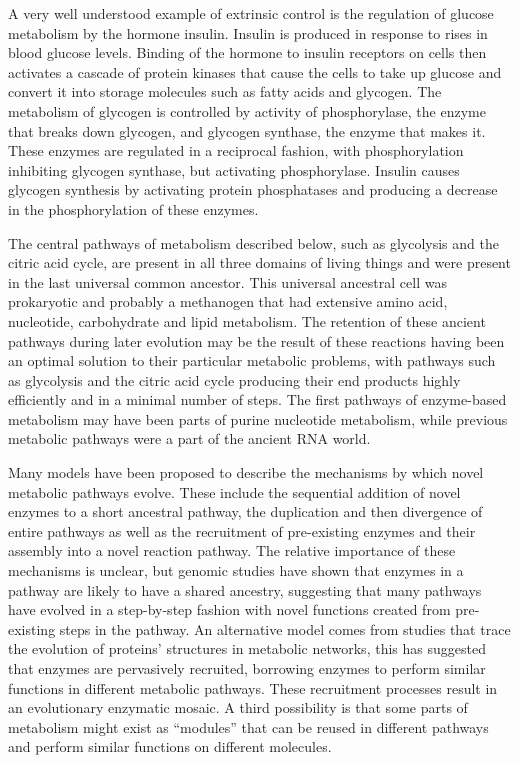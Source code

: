 A very well understood example of extrinsic control is the regulation of glucose metabolism by the hormone insulin. Insulin is produced in response to rises in blood glucose levels. Binding of the hormone to insulin receptors on cells then activates a cascade of protein kinases that cause the cells to take up glucose and convert it into storage molecules such as fatty acids and glycogen. The metabolism of glycogen is controlled by activity of phosphorylase, the enzyme that breaks down glycogen, and glycogen synthase, the enzyme that makes it. These enzymes are regulated in a reciprocal fashion, with phosphorylation inhibiting glycogen synthase, but activating phosphorylase. Insulin causes glycogen synthesis by activating protein phosphatases and producing a decrease in the phosphorylation of these enzymes.

The central pathways of metabolism described below, such as glycolysis and the citric acid cycle, are present in all three domains of living things and were present in the last universal common ancestor. This universal ancestral cell was prokaryotic and probably a methanogen that had extensive amino acid, nucleotide, carbohydrate and lipid metabolism. The retention of these ancient pathways during later evolution may be the result of these reactions having been an optimal solution to their particular metabolic problems, with pathways such as glycolysis and the citric acid cycle producing their end products highly efficiently and in a minimal number of steps. The first pathways of enzyme-based metabolism may have been parts of purine nucleotide metabolism, while previous metabolic pathways were a part of the ancient RNA world.

Many models have been proposed to describe the mechanisms by which novel metabolic pathways evolve. These include the sequential addition of novel enzymes to a short ancestral pathway, the duplication and then divergence of entire pathways as well as the recruitment of pre-existing enzymes and their assembly into a novel reaction pathway. The relative importance of these mechanisms is unclear, but genomic studies have shown that enzymes in a pathway are likely to have a shared ancestry, suggesting that many pathways have evolved in a step-by-step fashion with novel functions created from pre-existing steps in the pathway. An alternative model comes from studies that trace the evolution of proteins' structures in metabolic networks, this has suggested that enzymes are pervasively recruited, borrowing enzymes to perform similar functions in different metabolic pathways. These recruitment processes result in an evolutionary enzymatic mosaic. A third possibility is that some parts of metabolism might exist as ``modules'' that can be reused in different pathways and perform similar functions on different molecules.


